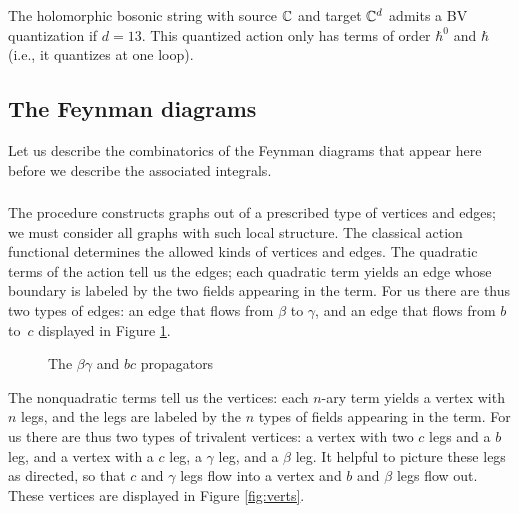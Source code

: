 \begin{prop}
The holomorphic bosonic string with source $\mathbb C$ and target $\mathbb C^d$ admits a BV quantization
if $d = 13$.
This quantized action only has terms of order $\hbar^0$ and $\hbar$ (i.e., it quantizes at one loop).
\end{prop}

\subsection{The Feynman diagrams}

Let us describe the combinatorics of the Feynman diagrams that appear here
before we describe the associated integrals.

\subsubsection{}

The procedure constructs graphs out of a prescribed type of vertices and edges;
we must consider all graphs with such local structure.
The classical action functional determines the allowed kinds of vertices and edges.
The quadratic terms of the action tell us the edges;
each quadratic term yields an edge whose boundary is labeled by the two fields appearing in the term.
For us there are thus two types of edges: 
an edge that flows from $\beta$ to $\gamma$, 
and an edge that flows from $b$ to~$c$ displayed in Figure \ref{fig:props}.
\begin{figure}
\caption{The $\beta\gamma$ and $bc$ propagators}
\label{fig:props}
\end{figure}

The nonquadratic terms tell us the vertices:
each $n$-ary term yields a vertex with $n$ legs,
and the legs are labeled by the $n$ types of fields appearing in the term.
For us there are thus two types of trivalent vertices:
a vertex with two $c$ legs and a $b$ leg, 
and a vertex with a $c$ leg, a $\gamma$ leg, and a $\beta$ leg.
It helpful to picture these legs as directed,
so that $c$ and $\gamma$ legs flow into a vertex
and $b$ and $\beta$ legs flow out. 
These vertices are displayed in Figure \ref{fig:verts}.

